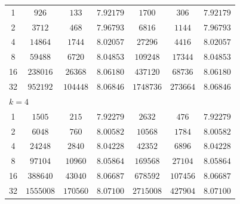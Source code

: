 \documentclass[english,11pt,3p,number,sort&compress]{elsarticle}
\begin{document}
\begin{table}[H]
\begin{tabular}{c c c c | c c c}
		1       & $926   $ & $133   $ & $7.92179$ & $1700   $ & $306   $ & $7.92179$ \\
        2       & $3712  $ & $468   $ & $7.96793$ & $6816   $ & $1144  $ & $7.96793$ \\
        4	    & $14864 $ & $1744  $ & $8.02057$ & $27296  $ & $4416  $ & $8.02057$ \\
        8	    & $59488 $ & $6720  $ & $8.04853$ & $109248 $ & $17344 $ & $8.04853$ \\
        16	  	& $238016$ & $26368 $ & $8.06180$ & $437120 $ & $68736 $ & $8.06180$ \\
        32	  	& $952192$ & $104448$ & $8.06846$ & $1748736$ & $273664$ & $8.06846$ \\
		\midrule
		\multicolumn{7}{l}{$k = 4$} \\
		1       & $1505   $ & $215   $ & $7.92279$ & $2632   $ & $476   $ & $7.92279$ \\
        2       & $6048   $ & $760   $ & $8.00582$ & $10568  $ & $1784  $ & $8.00582$ \\
        4	    & $24248  $ & $2840  $ & $8.04228$ & $42352  $ & $6896  $ & $8.04228$ \\
        8	    & $97104  $ & $10960 $ & $8.05864$ & $169568 $ & $27104 $ & $8.05864$ \\
        16	  	& $388640 $ & $43040 $ & $8.06687$ & $678592 $ & $107456$ & $8.06687$ \\
        32	  	& $1555008$ & $170560$ & $8.07100$ & $2715008$ & $427904$ & $8.07100$ \\
        \bottomrule
    \end{tabular}
	\label{tab:cooks-3d}
\end{table}
\end{document}
